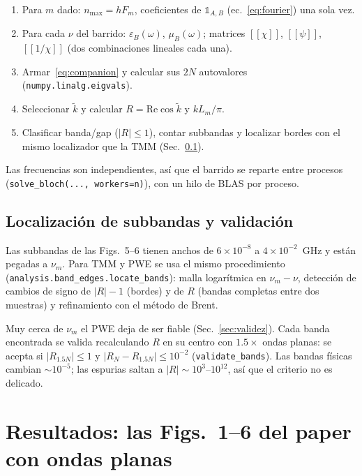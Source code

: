 \documentclass[11pt,a4paper]{article}
\newcommand{\toep}[1]{[\![#1]\!]}
\newcommand{\kt}{\tilde k}
\newcommand{\code}[1]{\texttt{#1}}
\begin{document}
\begin{enumerate}[label=\arabic*.]
\item Para $m$ dado: $n_{\max}=hF_m$, coeficientes de $\mathbb 1_{A,B}$
(ec.~\ref{eq:fourier}) una sola vez.
\item Para cada $\nu$ del barrido: $\varepsilon_B(\omega)$, $\mu_B(\omega)$;
matrices $\toep{\chi}$, $\toep{\psi}$, $\toep{1/\chi}$ (dos combinaciones
lineales cada una).
\item Armar~\eqref{eq:companion} y calcular sus $2N$ autovalores
(\code{numpy.linalg.eigvals}).
\item Seleccionar $\kt$ y calcular $R=\mathrm{Re}\cos\kt$ y $kL_m/\pi$.
\item Clasificar banda/gap ($|R|\le1$), contar subbandas y localizar bordes con
el mismo localizador que la TMM (Sec.~\ref{sec:bordes}).
\end{enumerate}
Las frecuencias son independientes, así que el barrido se reparte entre
procesos (\code{solve\_bloch(..., workers=n)}), con un hilo de BLAS por proceso.

\subsection{Localización de subbandas y validación}\label{sec:bordes}

Las subbandas de las Figs.~5--6 tienen anchos de $6\times10^{-8}$ a $4\times10^{-2}$~GHz y
están pegadas a $\nu_m$. Para TMM y PWE se usa el mismo procedimiento
(\code{analysis.band\_edges.locate\_bands}): malla logarítmica en $\nu_m-\nu$,
detección de cambios de signo de $|R|-1$ (bordes) y de $R$ (bandas completas
entre dos muestras) y refinamiento con el método de Brent.

Muy cerca de $\nu_m$ el PWE deja de ser fiable (Sec.~\ref{sec:validez}). Cada
banda encontrada se valida recalculando $R$ en su centro con $1.5\times$ ondas
planas: se acepta si $|R_{1.5N}|\le1$ y $|R_N-R_{1.5N}|\le10^{-2}$
(\code{validate\_bands}). Las bandas físicas cambian $\sim\!10^{-5}$; las
espurias saltan a $|R|\sim10^3$--$10^{12}$, así que el criterio no es delicado.

\section{Resultados: las Figs.~1--6 del paper con ondas planas}\label{sec:resultados}
\end{document}
